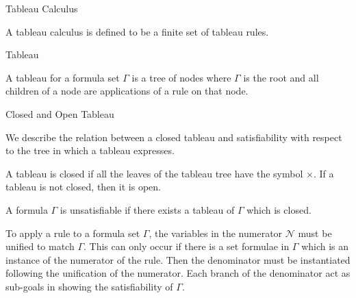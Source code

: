 \documentclass{llncs}
\begin{document}
\begin{definition}{Tableau Calculus}

A tableau calculus is defined to be a finite set of tableau rules.
\end{definition}
\begin{definition}{Tableau}

A tableau for a formula set $\Gamma$ is a tree of nodes where $\Gamma$ is the
root and all children of a node are applications of a rule on that node.
\end{definition}
\begin{definition}{Closed and Open Tableau}

We describe the relation between a closed tableau and satisfiability with
respect to the tree in which a tableau expresses.

A tableau is closed if all the leaves of the tableau tree have the symbol
$\times$.  If a tableau is not closed, then it is open.
\end{definition}
\begin{definition}

A formula $\Gamma$ is unsatisfiable if there exists a tableau of $\Gamma$ which
is closed.
\end{definition}
To apply a rule to a formula set $\Gamma$, the variables in the numerator
$\mathcal{N}$ must be unified to match $\Gamma$. This can only occur if there
is a set formulae in $\Gamma$ which is an instance of the numerator of the
rule. Then the denominator must be instantiated following the unification of
the numerator. Each branch of the denominator act as sub-goals in showing the
satisfiability of $\Gamma$.
\end{document}
